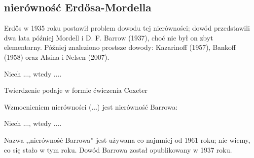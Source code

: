 %

\subsection{nierówność Erdősa-Mordella}
\label{subsection_erdos_mordell}
Erdős w 1935 roku postawił problem dowodu tej nierówności; dowód przedstawili dwa lata później Mordell i D. F. Barrow (1937), choć nie był on zbyt elementarny. Później znaleziono prostsze dowody: Kazarinoff (1957), Bankoff (1958) oraz Alsina i Nelsen (2007).

\begin{theorem}
    Niech ..., wtedy ....
\end{theorem}

Twierdzenie podaje w formie ćwiczenia Coxeter \cite[s. 9]{coxeter_1991}

Wzmocnieniem nierówności (...) jest nierówność Barrowa:


\begin{theorem}
    Niech ..., wtedy ....
\end{theorem}

Nazwa ,,nierówność Barrowa'' jest używana co najmniej od 1961 roku; nie wiemy, co się stało w tym roku.
Dowód Barrowa został opublikowany w 1937 roku.

%